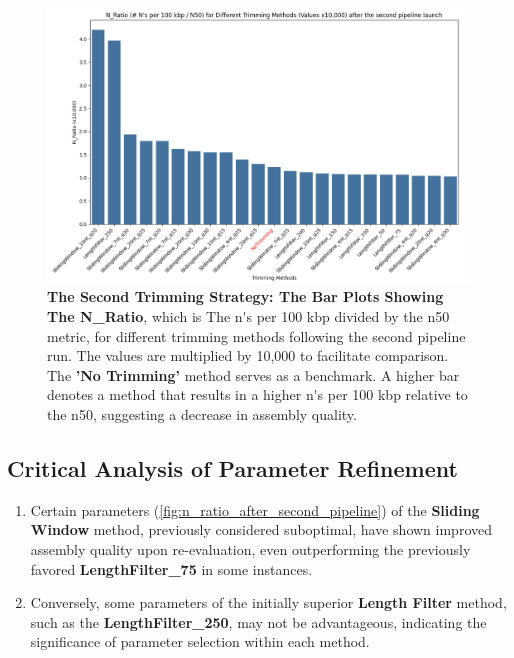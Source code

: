 \begin{figure}[H]
\centering
\includegraphics[width=\linewidth]{resources/images/n_ratio_2.png}
\caption{\textbf{The Second Trimming Strategy: The Bar Plots Showing The N\_Ratio}, which is The \gls{n's per 100 kbp} divided by the \gls{n50} metric, for different \gls{trimming} methods following the second pipeline run. The values are multiplied by 10,000 to facilitate comparison. The \textbf{'No Trimming'} method serves as a benchmark. A higher bar denotes a method that results in a higher \gls{n's per 100 kbp} relative to the \gls{n50}, suggesting a decrease in \gls{assembly} quality.}
\label{fig:n_ratio_after_second_pipeline}
\end{figure}



\subsection{Critical Analysis of Parameter Refinement}

\begin{enumerate}
  \item Certain parameters (\autoref{fig:n_ratio_after_second_pipeline}) of the \textbf{Sliding Window} method, previously considered suboptimal, have shown improved \gls{assembly} quality upon re-evaluation, even outperforming the previously favored \textbf{LengthFilter\_75} in some instances.
  \item Conversely, some parameters of the initially superior \textbf{Length Filter} method, such as the \textbf{LengthFilter\_250}, may not be advantageous, indicating the significance of parameter selection within each method.
\end{enumerate}


